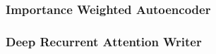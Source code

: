 


\subsubsection{Importance Weighted Autoencoder}
\label{ssub:vae_importance_weighted_autoencoder}


\subsubsection{Deep Recurrent Attention Writer}
\label{ssub:vae_deep_recurrent_attention_writer}


\newpage
